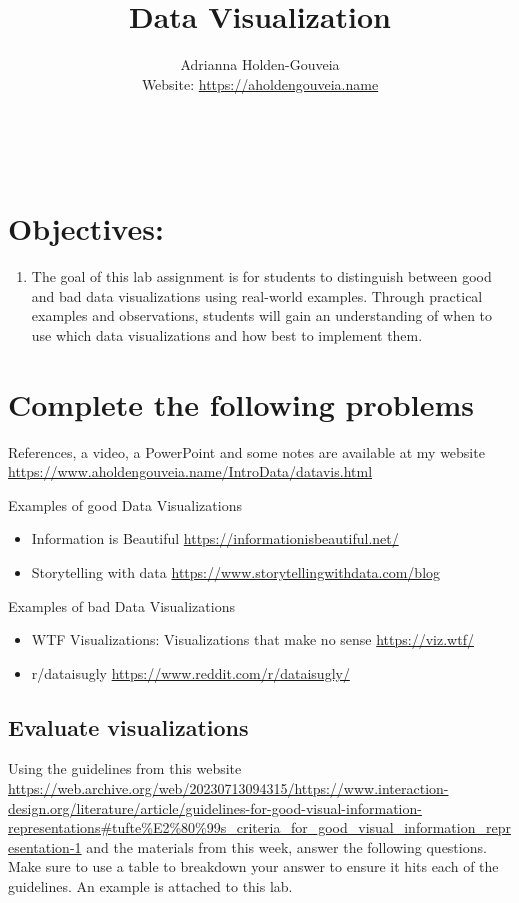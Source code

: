 \documentclass[12pt]{article}
\title{Data Visualization}
\author{
        Adrianna Holden-Gouveia \\
        Website: \url{https://aholdengouveia.name}\\ 
        \date{\vspace{-5ex}}
        \faLinkedin{: aholdengouveia} \\
        \faGithub {: aholdengouveia} \\
        }
\begin{document}
    

\maketitle


\section*{Objectives:}
\begin{enumerate}
    \item The goal of this lab assignment is for students to distinguish between good and bad data visualizations using real-world examples. Through practical examples and observations, students will gain an understanding of when to use which data visualizations and how best to implement them.
\end{enumerate}
\section*{Complete the following problems}

References, a video, a PowerPoint and some notes are available at my website
\url {https://www.aholdengouveia.name/IntroData/datavis.html}

Examples of good Data Visualizations
\begin{itemize}
    \item Information is Beautiful \url{https://informationisbeautiful.net/}
    \item Storytelling with data \url{https://www.storytellingwithdata.com/blog}
\end{itemize}    

Examples of bad Data Visualizations
\begin{itemize}
    \item WTF Visualizations: Visualizations that make no sense \url{https://viz.wtf/}
    \item r/dataisugly \url{https://www.reddit.com/r/dataisugly/}
\end{itemize}



\subsection*{Evaluate visualizations}
Using the guidelines from this website \url{https://web.archive.org/web/20230713094315/https://www.interaction-design.org/literature/article/guidelines-for-good-visual-information-representations#tufte%E2%80%99s_criteria_for_good_visual_information_representation-1} and the materials from this week, answer the following questions.  Make sure to use a table to breakdown your answer to ensure it hits each of the guidelines.  An example is attached to this lab.
\end{document}
